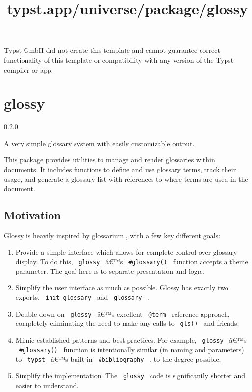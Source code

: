 Typst GmbH did not create this template and cannot guarantee correct
functionality of this template or compatibility with any version of the
Typst compiler or app.


\title{typst.app/universe/package/glossy}

\label{banner}
\section{glossy}\label{glossy}

{ 0.2.0 }

A very simple glossary system with easily customizable output.

\label{readme}
This package provides utilities to manage and render glossaries within
documents. It includes functions to define and use glossary terms, track
their usage, and generate a glossary list with references to where terms
are used in the document.


\subsection{Motivation}\label{motivation}

Glossy is heavily inspired by
\href{https://typst.app/universe/package/glossarium}{glossarium} , with
a few key different goals:

\begin{enumerate}
\tightlist
\item
  Provide a simple interface which allows for complete control over
  glossary display. To do this, \texttt{\ glossy\ } â€™s
  \texttt{\ \#glossary()\ } function accepts a theme parameter. The goal
  here is to separate presentation and logic.
\item
  Simplify the user interface as much as possible. Glossy has exactly
  two exports, \texttt{\ init-glossary\ } and \texttt{\ glossary\ } .
\item
  Double-down on \texttt{\ glossy\ } â€™s excellent \texttt{\ @term\ }
  reference approach, completely eliminating the need to make any calls
  to \texttt{\ gls()\ } and friends.
\item
  Mimic established patterns and best practices. For example,
  \texttt{\ glossy\ } â€™s \texttt{\ \#glossary()\ } function is
  intentionally similar (in naming and parameters) to \texttt{\ typst\ }
  â€™s built-in \texttt{\ \#bibliography\ } , to the degree possible.
\item
  Simplify the implementation. The \texttt{\ glossy\ } code is
  significantly shorter and easier to understand.
\end{enumerate}


